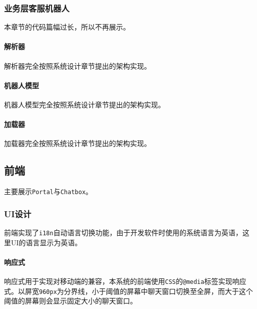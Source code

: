 \documentclass[hyperref]{ctexart}
\begin{document}
\subsubsection{业务层客服机器人}
本章节的代码篇幅过长，所以不再展示。
\paragraph{解析器}
解析器完全按照系统设计章节提出的架构实现。
\paragraph{机器人模型}
机器人模型完全按照系统设计章节提出的架构实现。
\paragraph{加载器}
加载器完全按照系统设计章节提出的架构实现。
\subsection{前端}
主要展示\texttt{Portal}与\texttt{Chatbox}。
\subsubsection{UI设计}
前端实现了\texttt{i18n}自动语言切换功能，由于开发软件时使用的系统语言为英语，这里UI的语言显示为英语。
\paragraph{响应式}
响应式用于实现对移动端的兼容，本系统的前端使用\texttt{CSS}的\texttt{@media}标签实现响应式。以屏宽\texttt{960px}为分界线，小于阈值的屏幕中聊天窗口切换至全屏，而大于这个阈值的屏幕则会显示固定大小的聊天窗口。
\end{document}
